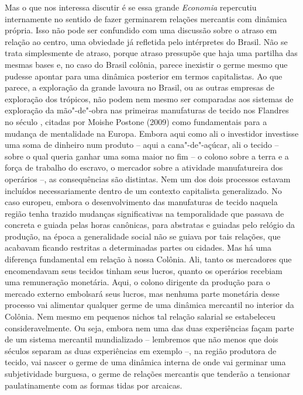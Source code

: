 Mas o que nos interessa discutir é se essa grande \emph{Economia}
repercutiu internamente no sentido de fazer germinarem relações
mercantis com dinâmica própria. Isso não pode ser confundido com uma
discussão sobre o atraso em relação ao centro, uma obviedade já
refletida pelo intérpretes do Brasil. Não se trata simplesmente de
atraso, porque atraso pressupõe que haja uma partilha das mesmas bases
e, no caso do Brasil colônia, parece inexistir o germe mesmo que pudesse
apontar para uma dinâmica posterior em termos capitalistas. Ao que
parece, a exploração da grande lavoura no Brasil, ou as outras empresas
de exploração dos trópicos, não podem nem mesmo ser comparadas aos
sistemas de exploração da mão"-de"-obra nas primeiras manufaturas de
tecido nos Flandres no século , citadas por Moishe Postone (2009)
como fundamentais para a mudança de mentalidade na Europa. Embora aqui
como ali o investidor investisse uma soma de dinheiro num produto --
aqui a cana"-de"-açúcar, ali o tecido -- sobre o qual queria ganhar uma
soma maior no fim -- o colono sobre a terra e a força de trabalho do
escravo, o mercador sobre a atividade manufatureira dos operários --, as
consequências são distintas. Nem um dos dois processos estavam incluídos
necessariamente dentro de um contexto capitalista generalizado. No caso
europeu, embora o desenvolvimento das manufaturas de tecido naquela
região tenha trazido mudanças significativas na temporalidade que
passava de concreta e guiada pelas horas canônicas, para abstratas e
guiadas pelo relógio da produção, na época a generalidade social não se
guiava por tais relações, que acabavam ficando restritas a determinadas
partes ou cidades. Mas há uma diferença fundamental em relação à nossa
Colônia. Ali, tanto os mercadores que encomendavam seus tecidos tinham
seus lucros, quanto os operários recebiam uma remuneração monetária.
Aqui, o colono dirigente da produção para o mercado externo embolsará
seus lucros, mas nenhuma parte monetária desse processo vai alimentar
qualquer germe de uma dinâmica mercantil no interior da Colônia. Nem
mesmo em pequenos nichos tal relação salarial se estabeleceu
consideravelmente. Ou seja, embora nem uma das duas experiências façam
parte de um sistema mercantil mundializado -- lembremos que não menos
que dois séculos separam as duas experiências em exemplo --, na região
produtora de tecido, vai nascer o germe de uma dinâmica interna de onde
vai germinar uma subjetividade burguesa, o germe de relações mercantis
que tenderão a tensionar paulatinamente com as formas tidas por
arcaicas.

